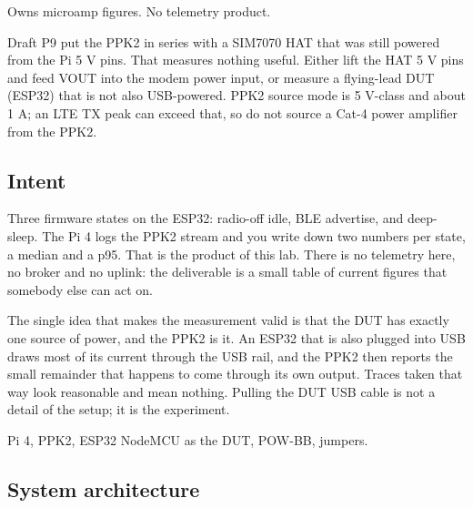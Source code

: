 
\begin{unique}
Owns microamp figures. No telemetry product.
\end{unique}

\begin{blueprint}
Draft P9 put the PPK2 in series with a SIM7070 HAT that was still powered from the Pi 5 V
pins. That measures nothing useful. Either lift the HAT 5 V pins and feed VOUT into the
modem power input, or measure a flying-lead DUT (ESP32) that is not also USB-powered. PPK2
source mode is 5 V-class and about 1 A; an LTE TX peak can exceed that, so do not source a
Cat-4 power amplifier from the PPK2.
\end{blueprint}

\subsection*{Intent}

Three firmware states on the ESP32: radio-off idle, BLE advertise, and deep-sleep. The
Pi 4 logs the PPK2 stream and you write down two numbers per state, a median and a p95.
That is the product of this lab. There is no telemetry here, no broker and no uplink: the
deliverable is a small table of current figures that somebody else can act on.

The single idea that makes the measurement valid is that the DUT has exactly one source of
power, and the PPK2 is it. An ESP32 that is also plugged into USB draws most of its current
through the USB rail, and the PPK2 then reports the small remainder that happens to come
through its own output. Traces taken that way look reasonable and mean nothing. Pulling the
DUT USB cable is not a detail of the setup; it is the experiment.

\begin{kit}
Pi 4, PPK2, ESP32 NodeMCU as the DUT, POW-BB, jumpers.
\end{kit}

\subsection*{System architecture}


